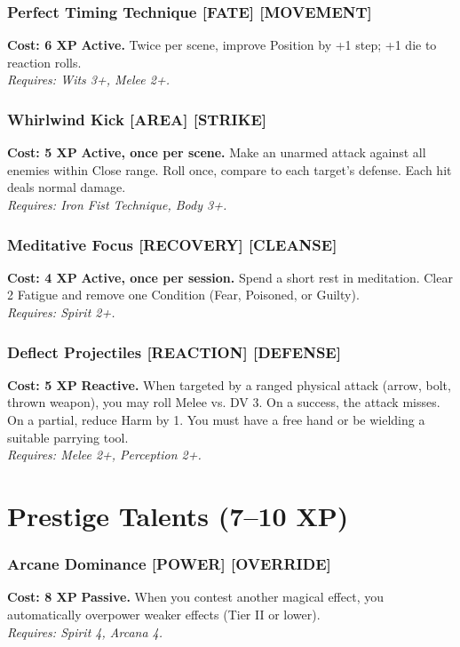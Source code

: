 \subsubsection*{Perfect Timing Technique \textnormal{[FATE] [MOVEMENT]}}
\label{talent:perfect-timing-technique}
\textbf{Cost: 6 XP} \textbf{Active.} Twice per scene, improve Position by +1 step; +1 die to reaction rolls. \\
\textit{Requires: Wits 3+, Melee 2+.}

\subsubsection*{Whirlwind Kick \textnormal{[AREA] [STRIKE]}}
\label{talent:whirlwind-kick}
\textbf{Cost: 5 XP} \textbf{Active, once per scene.} Make an unarmed attack against all enemies within Close range. Roll once, compare to each target's defense. Each hit deals normal damage. \\
\textit{Requires: Iron Fist Technique, Body 3+.}

\subsubsection*{Meditative Focus \textnormal{[RECOVERY] [CLEANSE]}}
\label{talent:meditative-focus}
\textbf{Cost: 4 XP} \textbf{Active, once per session.} Spend a short rest in meditation. Clear 2 Fatigue and remove one Condition (Fear, Poisoned, or Guilty). \\
\textit{Requires: Spirit 2+.}

\subsubsection*{Deflect Projectiles \textnormal{[REACTION] [DEFENSE]}}
\label{talent:deflect-projectiles}
\textbf{Cost: 5 XP} \textbf{Reactive.} When targeted by a ranged physical attack (arrow, bolt, thrown weapon), you may roll Melee vs. DV 3. On a success, the attack misses. On a partial, reduce Harm by 1. You must have a free hand or be wielding a suitable parrying tool. \\
\textit{Requires: Melee 2+, Perception 2+.}

\section{Prestige Talents (7--10 XP)}
\label{sec:prestige-talents}

\subsubsection*{Arcane Dominance \textnormal{[POWER] [OVERRIDE]}}
\label{talent:arcane-dominance}
\textbf{Cost: 8 XP} \textbf{Passive.} When you contest another magical effect, you automatically overpower weaker effects (Tier II or lower). \\
\textit{Requires: Spirit 4, Arcana 4.}

